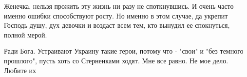 \begin{itemize}
\begin{itemize}
 

Женечка, нельзя прожить эту жизнь ни разу не споткнувшись. И очень часто именно
ошибки способствуют росту. Но именно в этом случае, да укрепит Господь душу,
дух девочки и воздаст всем тем, кто вынудил ее спокнуться, полной мерой.


 
Ради Бога. Устраивают Украину такие герои, потому что - "свои" и "без темного
прошлого", пусть хоть со Стерненками ходят. Мне все равно. Не мое дело. Любите
их

\end{itemize}

\end{itemize}


